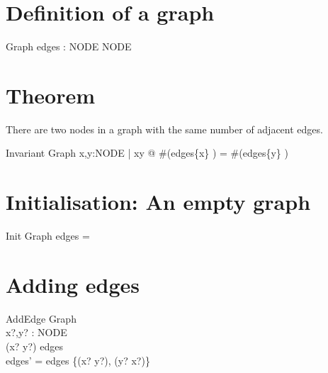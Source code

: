\documentclass{article}
\begin{document}
\section{Definition of a graph}

\begin{zed}
  [NODE]
\end{zed}

\begin{schema}{Graph}
  edges : NODE \rel NODE
\end{schema}

\section{Theorem}

There are two nodes in a graph with the same number of adjacent edges.

\begin{schema}{Invariant}
  Graph
  \where
  \exists x,y:NODE | x\neq y @ \#(edges\limg \{x\} \rimg) = \#(edges\limg \{y\} \rimg)
\end{schema}

\section{Initialisation: An empty graph}

\begin{schema}{Init}
  Graph
  \where
  edges = \emptyset
\end{schema}

\section{Adding edges}
\begin{schema}{AddEdge}
  \Delta Graph\\
  x?,y? : NODE\\
  \where
  (x? \mapsto y?) \notin edges\\
  edges' = edges \cup \{(x? \mapsto y?), (y? \mapsto x?)\}
\end{schema}
\end{document}
